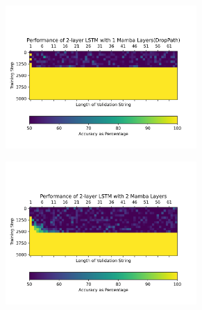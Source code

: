 \begin{figure}
\begin{subfigure}{0.5\textwidth}
\begin{center}
        \end{center}
    \end{subfigure}\begin{subfigure}{0.5\textwidth}
        \begin{center}
        \includegraphics[width=0.8\textwidth]{figures/parity_lstm_True_3_2.png}
        \end{center}
    \end{subfigure}
    \begin{subfigure}{0.5\textwidth}
        \begin{center}
        \includegraphics[width=0.8\textwidth]{figures/parity_lstm_False_4_1.png}
        \end{center}
    \end{subfigure}\begin{subfigure}{0.5\textwidth}
        \begin{center}

\end{center}
\end{subfigure}
\end{figure}

